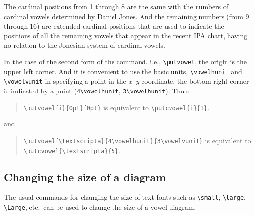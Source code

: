 \documentclass[a4paper]{article}
\begin{document}
The cardinal positions from 1 through 8 are the same with the numbers
of cardinal vowels determined by Daniel Jones. And the remaining
numbers (from 9 through 16) are extended cardinal positions that are
used to indicate the positions of all the remaining vowels that appear 
in the recent IPA chart, having no relation to the Jonesian system of
cardinal vowels.

In the case of the second form of the command. i.e., \verb+\putvowel+,
the origin is the upper left corner. And it is convenient to use the
basic units, \verb|\vowelhunit| and \verb|\vowelvunit| in specifying a 
point in the $x$--$y$ coordinate. the bottom right corner is indicated 
by a point (\verb|4\vowelhunit|, \verb|3\vowelhunit|). Thus:

\begin{quote}
\verb+\putvowel{i}{0pt}{0pt}+ is equivalent to
\verb+\putcvowel{i}{1}+.
\end{quote}

and

\begin{quote}
\verb+\putvowel{\textscripta}{4\vowelhunit}{3\vowelvunit}+ is
equivalent to \verb+\putcvowel{\textscripta}{5}+.
\end{quote}

\subsection{Changing the size of a diagram}

The usual commands for changing the size of text fonts such as
\verb|\small|, \verb|\large|, \verb|\Large|, etc.\ can be used to
change the size of a vowel diagram. 
\end{document}
